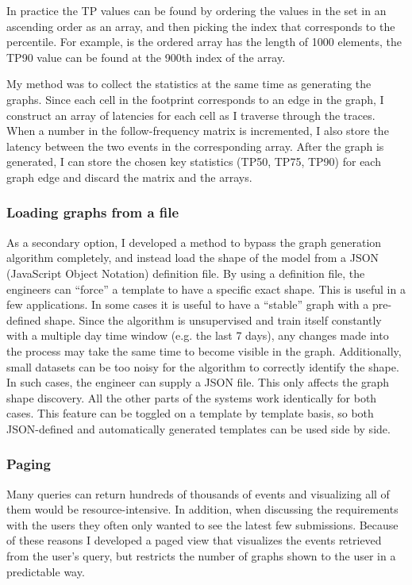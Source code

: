 In practice the TP values can be found by ordering the values in the set in an ascending order as an array, and then picking the index that corresponds to the percentile. For example, is the ordered array has the length of 1000 elements, the TP90 value can be found at the 900th index of the array.

My method was to collect the statistics at the same time as generating the graphs.
Since each cell in the footprint corresponds to an edge in the graph, I construct an array of latencies for each cell as I traverse through the traces.
When a number in the follow-frequency matrix is incremented, I also store the latency between the two events in the corresponding array. 
After the graph is generated, I can store the chosen key statistics (TP50, TP75, TP90) for each graph edge and discard the matrix and the arrays.

\subsubsection{Loading graphs from a file}
\label{sec:jsonfile}

As a secondary option, I developed a method to bypass the graph generation algorithm completely, and instead load the shape of the model from a JSON (JavaScript Object Notation) definition file.
By using a definition file, the engineers can ``force'' a template to have a specific exact shape.
This is useful in a few applications.
In some cases it is useful to have a ``stable'' graph with a pre-defined shape.
Since the algorithm is unsupervised and train itself constantly with a multiple day time window (e.g. the last 7 days), any changes made into the process may take the same time to become visible in the graph.
Additionally, small datasets can be too noisy for the algorithm to correctly identify the shape.
In such cases, the engineer can supply a JSON file.
This only affects the graph shape discovery. 
All the other parts of the systems work identically for both cases.
This feature can be toggled on a template by template basis, so both JSON-defined and automatically generated templates can be used side by side.

\subsubsection{Paging}
\label{sec:paging}

Many queries can return hundreds of thousands of events and visualizing all of them would be resource-intensive.
In addition, when discussing the requirements with the users they often only wanted to see the latest few submissions.
Because of these reasons I developed a paged view that visualizes the events retrieved from the user's query, but restricts the number of graphs shown to the user in a predictable way.

